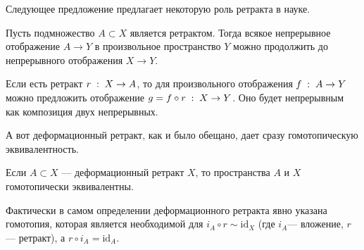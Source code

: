Следующее предложение предлагает некоторую роль ретракта в науке.
\begin{Prop}
   Пусть подмножество $A\subset X$ является ретрактом. Тогда всякое непрерывное отображение $A\to Y$ в произвольное пространство $Y$ можно продолжить до непрерывного отображения $X\to Y$.
\end{Prop}
\begin{Proof}
    Если есть ретракт $r\; : \; X\to A$, то для произвольного отображения  $f\; : \; A \to Y$ можно предложить отображение $g = f \circ r \; : \; X \to Y$. Оно будет непрерывным как композиция двух непрерывных.
\end{Proof}

А вот деформационный ретракт, как и было обещано, дает сразу гомотопическую эквивалентность.
\begin{Prop}
    Если $A\subset X$ --- деформационный ретракт $X$, то пространства $A $ и $X$ гомотопически эквивалентны.
\end{Prop}
\begin{Proof}
    Фактически в самом определении деформационного ретракта явно указана гомотопия, которая является необходимой для $i_A \circ r \sim \mathrm{id}_X$ (где $i_A$--- вложение, $r$ --- ретракт), а $r \circ i_A = \mathrm{id}_A$.
\end{Proof}

